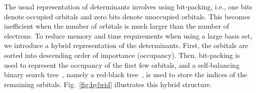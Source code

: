 \documentclass[%
reprint,
 superscriptaddress,
 amsmath,amssymb,
 aps,
]{revtex4-1}
\begin{document}
The usual representation of determinants involves using bit-packing, i.e., one bits denote occupied orbitals
and zero bits denote unoccupied orbitals.  This becomes inefficient when the number of orbitals is much
larger than the number of electrons.
To reduce memory and time requirements when using a large basis set, we introduce a hybrid representation of the determinants.
First, the orbitals are sorted into descending order of importance (occupancy).
Then, bit-packing is used to represent the occupancy of the first few orbitals, and a self-balancing binary search tree~\cite{wiki:binarysearchtree}, namely a red-black tree~\cite{wiki:redblacktree}, is used to store the indices of the remaining orbitals.
Fig.~\ref{fig:hybrid} illustrates this hybrid structure.
\end{document}
